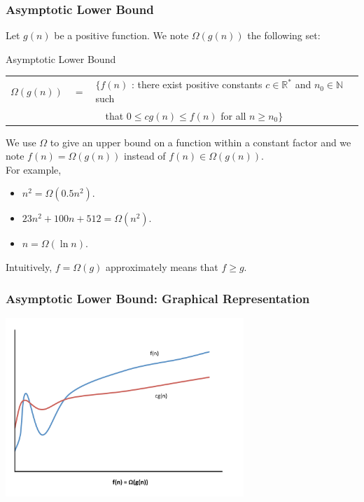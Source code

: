 \documentclass{beamer}
\begin{document}
\begin{frame}%
\frametitle{Asymptotic Lower Bound}

\scriptsize

Let $g(n)$ be a positive function. We note $\Omega(g(n))$ the following set:

\begin{block}{Asymptotic Lower Bound}
\begin{tabular}{lcl}
$\Omega(g(n))$ & $=$ & $\{ f(n)$ : there exist positive constants $c \in \mathbb{R}^*$ and $n_0 \in \mathbb{N}$ such\\
& & \ \ that $0 \le cg(n) \le f(n)$ for all $n \ge n_0 \}$\\
\end{tabular}
\end{block}
We use $\Omega$ to give an upper bound on a function within a constant factor and we
note $f(n) = \Omega(g(n))$ instead of $f(n) \in \Omega(g(n))$.\\
\vspace{0.3cm}
For example,
\begin{itemize}
\item $n^2 = \Omega(0.5n^2)$.
\item $23n^2 + 100n + 512 = \Omega(n^2)$.
\item $n = \Omega(\ln n)$.
\end{itemize}

\vspace{0.3cm}

Intuitively, $f = \Omega(g)$ approximately means that $f \ge g$.

\end{frame}

\begin{frame}[containsverbatim]
\frametitle{Asymptotic Lower Bound: Graphical Representation}

\begin{center}
\includegraphics[width=9cm]{big_omega.pdf}%
\end{center}

\end{frame}
\end{document}
